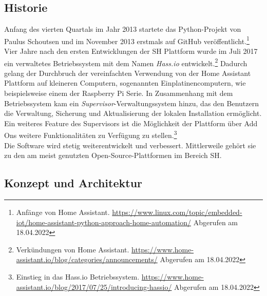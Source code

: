     \subsection*{Historie}
    \label{sec:historyHOAS}
        Anfang des vierten Quartals im Jahr 2013 startete das Python-Projekt von Paulus Schoutsen und im November 2013 erstmals auf GitHub 
        veröffentlicht.\footnote{Anfänge von Home Assistant. \url{https://www.linux.com/topic/embedded-iot/home-assistant-python-approach-home-automation/} Abgerufen am 18.04.2022}
        \\
        \linebreak
        Vier Jahre nach den ersten Entwicklungen der \acl{SH} Plattform wurde im Juli 2017 ein verwaltetes Betriebssystem mit dem Namen 
        \textit{Hass.io} entwickelt.\footnote{Verkündungen von Home Assistant. \url{https://www.home-assistant.io/blog/categories/announcements/} Abgerufen am 18.04.2022} 
        Dadurch gelang der Durchbruch der vereinfachten Verwendung von der Home Assistant Plattform auf kleineren Computern, sogenannten 
        Einplatinencomputern, wie beispielsweise einem der Raspberry Pi Serie. In Zusammenhang mit dem Betriebssystem kam ein 
        \textit{Supervisor}-Verwaltungssystem hinzu, das den Benutzern die Verwaltung, Sicherung und Aktualisierung der lokalen Installation 
        ermöglicht. Ein weiteres Feature des Supervisors ist die Möglichkeit der Plattform über Add Ons weitere Funktionalitäten zu Verfügung zu 
        stellen.\footnote{Einstieg in das Hass.io Betriebssystem. \url{https://www.home-assistant.io/blog/2017/07/25/introducing-hassio/} Abgerufen am 18.04.2022}
        \\
        \linebreak
        Die Software wird stetig weiterentwickelt und verbessert. Mittlerweile gehört sie zu den am meist genutzten Open-Source-Plattformen 
        im Bereich \acl{SH}.

\subsection{Konzept und Architektur}
\label{sec:conceptArchitectureHAOS}


